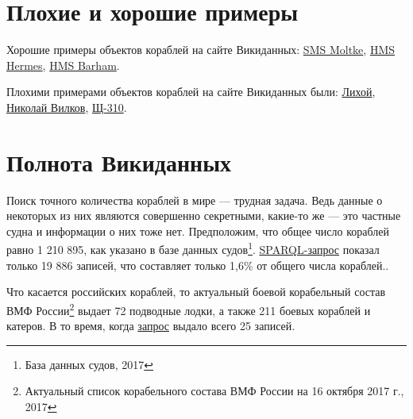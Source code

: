 \section{Плохие и хорошие примеры}

Хорошие примеры объектов кораблей на сайте Викиданных: \href{https://www.wikidata.org/wiki/Q613128}{SMS Moltke}, \href{https://www.wikidata.org/wiki/Q596282}{HMS Hermes}, \href{https://www.wikidata.org/wiki/Q596282}{HMS Barham}.

Плохими примерами объектов кораблей на сайте Викиданных были: \href{https://www.wikidata.org/wiki/Q4264229}{Лихой}, \href{https://www.wikidata.org/wiki/Q18816894}{Николай Вилков}, \href{https://www.wikidata.org/wiki/Q4528362}{Щ-310}.

\section{Полнота Викиданных}

Поиск точного количества кораблей в мире — трудная задача. Ведь данные о некоторых из них являются совершенно секретными, какие-то же — это частные судна и информации о них тоже нет. Предположим, что общее число кораблей равно 1 210 895, как указано в базе данных судов\footnote{База данных судов, 2017}. \href{https://query.wikidata.org/#%23List%20of%20ships%20in%20English%20and%20Russian%0ASELECT%20%3Fship%20%3FshipLabel%0AWHERE%0A%7B%0A%20%20%3Fship%20wdt%3AP31%20wd%3AQ11446.%0A%20%20SERVICE%20wikibase%3Alabel%20%7B%20bd%3AserviceParam%20wikibase%3Alanguage%20"en".%20%7D%0A%7D}{SPARQL-запрос} показал только 19 886 записей, что составляет только 1,6\% от общего числа кораблей..

Что касается российских кораблей, то актуальный боевой корабельный состав ВМФ России\footnote{Актуальный список корабельного состава ВМФ России на 16 октября 2017 г., 2017} выдает 72 подводные лодки, а также 211 боевых кораблей и катеров. В то время, когда \href{https://query.wikidata.org/#%23List%20of%20ships%20%0ASELECT%20%3Fship%20%3FshipLabel%0AWHERE%0A%7B%0A%20%20%3Fship%20wdt%3AP31%20wd%3AQ11446.%0A%20%20SERVICE%20wikibase%3Alabel%20%7B%20bd%3AserviceParam%20wikibase%3Alanguage%20"en".%20%7D%0A%20%20%20%20%20%20%20%20%20%20%20%20%20%20%20%20%20%20%20%20%20%20%20%20%20%20%20%20%20%20%20%20%20%20%20%20%20%23%20ships%20are%3A%0A%20%20%7B%20%3Fship%20wdt%3AP17%20wd%3AQ34266%20%7D%20UNION%20%20%23%20Russian%20Empire%0A%20%20%7B%20%3Fship%20wdt%3AP17%20wd%3AQ15180%20%7D%20UNION%20%20%23%20Soviet%20Union%0A%20%20%7B%20%3Fship%20wdt%3AP17%20wd%3AQ159%20%7D.%20%20%20%20%20%20%20%20%20%23%20Russia%0A%7D%0A}{запрос} выдало всего 25 записей.

